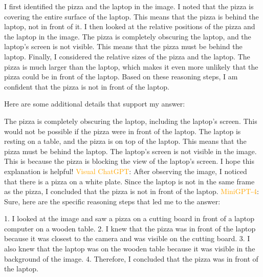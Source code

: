 \begin{enumerate}
        I first identified the pizza and the laptop in the image.
        I noted that the pizza is covering the entire surface of the laptop. This means that the pizza is behind the laptop, not in front of it.
        I then looked at the relative positions of the pizza and the laptop in the image. The pizza is completely obscuring the laptop, and the laptop's screen is not visible. This means that the pizza must be behind the laptop.
        Finally, I considered the relative sizes of the pizza and the laptop. The pizza is much larger than the laptop, which makes it even more unlikely that the pizza could be in front of the laptop.
        Based on these reasoning steps, I am confident that the pizza is not in front of the laptop.

        Here are some additional details that support my answer:

        The pizza is completely obscuring the laptop, including the laptop's screen. This would not be possible if the pizza were in front of the laptop.
        The laptop is resting on a table, and the pizza is on top of the laptop. This means that the pizza must be behind the laptop.
        The laptop's screen is not visible in the image. This is because the pizza is blocking the view of the laptop's screen.
        I hope this explanation is helpful!
        \subitem \textcolor{orange}{Visual ChatGPT}: After observing the image, I noticed that there is a pizza on a white plate. Since the laptop is not in the same frame as the pizza, I concluded that the pizza is not in front of the laptop.
        \subitem \textcolor{orange}{MiniGPT-4}: Sure, here are the specific reasoning steps that led me to the answer:

        1. I looked at the image and saw a pizza on a cutting board in front of a laptop computer on a wooden table.
        2. I knew that the pizza was in front of the laptop because it was closest to the camera and was visible on the cutting board.
        3. I also knew that the laptop was on the wooden table because it was visible in the background of the image.
        4. Therefore, I concluded that the pizza was in front of the laptop.
    \end{enumerate}

